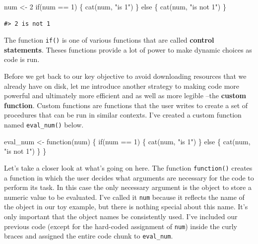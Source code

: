 \documentclass[
  letterpaper,
]{latex/krantz}
\newenvironment{Shaded}{\begin{snugshade}}{\end{snugshade}}
\newcommand{\ControlFlowTok}[1]{\textcolor[rgb]{0.00,0.23,0.31}{#1}}
\newcommand{\DecValTok}[1]{\textcolor[rgb]{0.68,0.00,0.00}{#1}}
\newcommand{\FunctionTok}[1]{\textcolor[rgb]{0.28,0.35,0.67}{#1}}
\newcommand{\NormalTok}[1]{\textcolor[rgb]{0.00,0.23,0.31}{#1}}
\newcommand{\OtherTok}[1]{\textcolor[rgb]{0.00,0.23,0.31}{#1}}
\newcommand{\SpecialCharTok}[1]{\textcolor[rgb]{0.37,0.37,0.37}{#1}}
\newcommand{\StringTok}[1]{\textcolor[rgb]{0.13,0.47,0.30}{#1}}
\begin{document}
\begin{Shaded}
\begin{Highlighting}[]
\NormalTok{num }\OtherTok{\textless{}{-}} \DecValTok{2}
\ControlFlowTok{if}\NormalTok{(num }\SpecialCharTok{==} \DecValTok{1}\NormalTok{) \{ }
  \FunctionTok{cat}\NormalTok{(num, }\StringTok{"is 1"}\NormalTok{) }
\NormalTok{  \} }\ControlFlowTok{else}\NormalTok{ \{}
  \FunctionTok{cat}\NormalTok{(num, }\StringTok{"is not 1"}\NormalTok{)}
\NormalTok{  \}}
\end{Highlighting}
\end{Shaded}

\begin{verbatim}
#> 2 is not 1
\end{verbatim}

The function \texttt{if()} is one of various functions that are called
\textbf{control statements}. Theses functions provide a lot of power to
make dynamic choices as code is run.

Before we get back to our key objective to avoid downloading resources
that we already have on disk, let me introduce another strategy to
making code more powerful and ultimately more efficient and as well as
more legible --the \textbf{custom function}. Custom functions are
functions that the user writes to create a set of procedures that can be
run in similar contexts. I've created a custom function named
\texttt{eval\_num()} below.

\begin{Shaded}
\begin{Highlighting}[]
\NormalTok{eval\_num }\OtherTok{\textless{}{-}} \ControlFlowTok{function}\NormalTok{(num) \{}
  \ControlFlowTok{if}\NormalTok{(num }\SpecialCharTok{==} \DecValTok{1}\NormalTok{) \{ }
  \FunctionTok{cat}\NormalTok{(num, }\StringTok{"is 1"}\NormalTok{) }
\NormalTok{  \} }\ControlFlowTok{else}\NormalTok{ \{}
  \FunctionTok{cat}\NormalTok{(num, }\StringTok{"is not 1"}\NormalTok{)}
\NormalTok{  \}}
\NormalTok{\}}
\end{Highlighting}
\end{Shaded}

Let's take a closer look at what's going on here. The function
\texttt{function()} creates a function in which the user decides what
arguments are necessary for the code to perform its task. In this case
the only necessary argument is the object to store a numeric value to be
evaluated. I've called it \texttt{num} because it reflects the name of
the object in our toy example, but there is nothing special about this
name. It's only important that the object names be consistently used.
I've included our previous code (except for the hard-coded assignment of
\texttt{num}) inside the curly braces and assigned the entire code chunk
to \texttt{eval\_num}.
\end{document}
